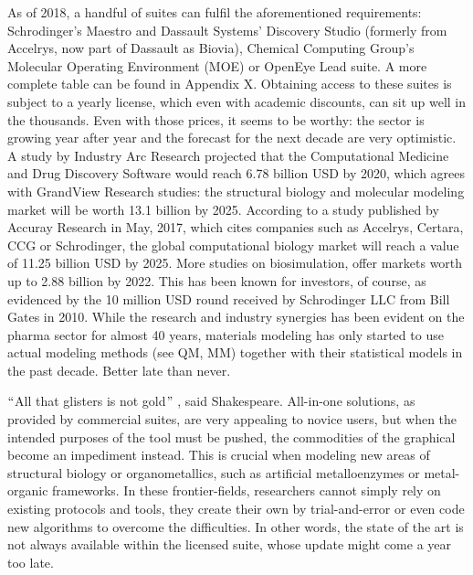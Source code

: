 As of 2018, a handful of suites can fulfil the aforementioned requirements: Schrodinger’s Maestro and Dassault Systems’ Discovery Studio (formerly from Accelrys, now part of Dassault as Biovia), Chemical Computing Group’s Molecular Operating Environment (MOE) or OpenEye Lead suite. A more complete table can be found in Appendix X. Obtaining access to these suites is subject to a yearly license, which even with academic discounts, can sit up well in the thousands. Even with those prices, it seems to be worthy: the sector is growing year after year and the forecast for the next decade are very optimistic. A study by Industry Arc Research projected that the Computational Medicine and Drug Discovery Software would reach 6.78 billion USD by 2020,\cite{industryarc} which agrees with GrandView Research studies: the structural biology and molecular modeling market will be worth 13.1 billion by 2025.\cite{grandviewresearch} According to a study published by Accuray Research in May, 2017,\cite{Accuray} which cites companies such as Accelrys, Certara, CCG or Schrodinger, the global computational biology market will reach a value of 11.25 billion USD by 2025. More studies on biosimulation, offer markets worth up to 2.88 billion by 2022.\cite{marketsandmarkets} This has been known for investors, of course, as evidenced by the 10 million USD round received by Schrodinger LLC from Bill Gates in 2010. While the research and industry synergies has been evident on the pharma sector for almost 40 years, materials modeling has only started to use actual modeling methods (see QM, MM) together with their statistical models in the past decade.\cite{hpc2020} Better late than never.


$``$All that glisters is not gold$"$ , said Shakespeare. All-in-one solutions, as provided by commercial suites, are very appealing to novice users, but when the intended purposes of the tool must be pushed, the commodities of the graphical become an impediment instead. This is crucial when modeling new areas of structural biology or organometallics, such as artificial metalloenzymes or metal-organic frameworks. In these frontier-fields, researchers cannot simply rely on existing protocols and tools, they create their own by trial-and-error or even code new algorithms to overcome the difficulties. In other words, the state of the art is not always available within the licensed suite, whose update might come a year too late.

